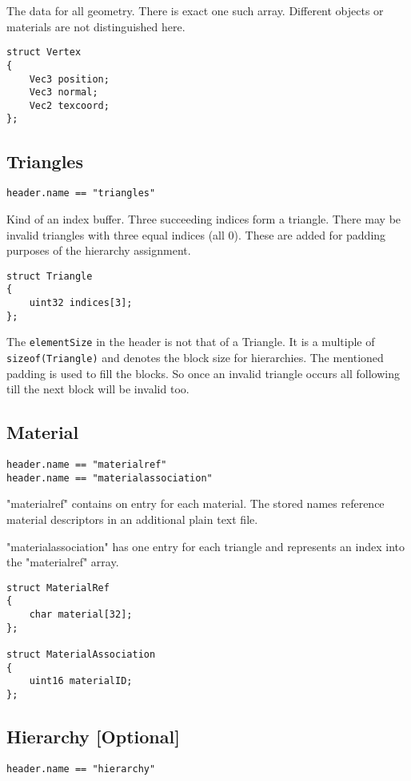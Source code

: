 \documentclass[english,10pt,a4paper,twocolumn,colorscheme=green]{orarticle}
\begin{document}
	The data for all geometry. There is exact one such array. Different objects
	or materials are not distinguished here.
	\begin{lstlisting}
struct Vertex
{
	Vec3 position;
	Vec3 normal;
	Vec2 texcoord;
};
	\end{lstlisting}
	
	\subsection{Triangles}
	\lstinline|header.name == "triangles"|
	
	Kind of an index buffer. Three succeeding indices form a triangle. There may be invalid triangles with three equal indices (all 0). These are added for padding purposes of the hierarchy assignment.
	\begin{lstlisting}
struct Triangle
{
	uint32 indices[3];
};
	\end{lstlisting}
	The \lstinline|elementSize| in the header is not that of a Triangle. It is a multiple of \lstinline|sizeof(Triangle)| and denotes the block size for hierarchies. The mentioned padding is used to fill the blocks. So once an invalid triangle occurs all following till the next block will be invalid too.
	
	\subsection{Material}
	\lstinline|header.name == "materialref"|\\
	\lstinline|header.name == "materialassociation"|
	
	"materialref" contains on entry for each material. The stored names reference material descriptors in an additional plain text file.
	
	"materialassociation" has one entry for each triangle and represents an index into the "materialref" array.
	\begin{lstlisting}
struct MaterialRef
{
	char material[32];
};

struct MaterialAssociation
{
	uint16 materialID;
};
	\end{lstlisting}
	
	\subsection{Hierarchy [Optional]}
	\lstinline|header.name == "hierarchy"|
	
\end{document}
